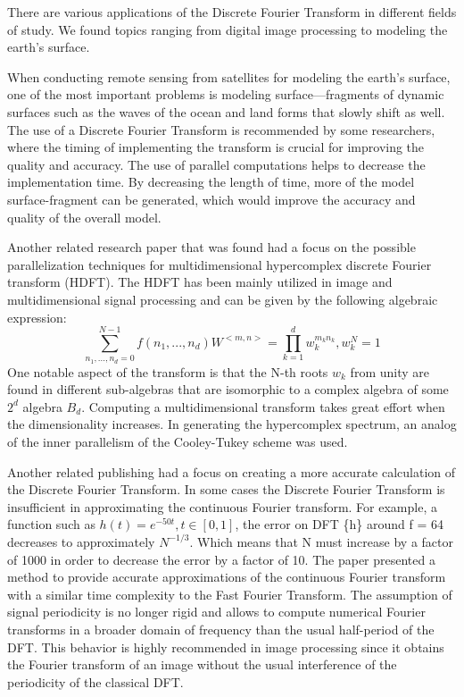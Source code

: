 \documentclass[journal]{IEEEtran}
\begin{document}
	\par{
		There are various applications of the Discrete Fourier Transform in different fields of study. We found topics ranging from digital 
		image processing to modeling the earth's surface.
	}
	\par{
		When conducting remote sensing from satellites for modeling the earth's surface, one of the most important problems is 
		modeling surface—fragments of dynamic surfaces such as the waves of the ocean and land forms that slowly shift as well. 
		The use of a Discrete Fourier Transform is recommended by some researchers, where the timing of implementing the transform 
		is crucial for improving the quality and accuracy. The use of parallel computations helps to decrease the implementation time. 
		By decreasing the length of time, more of the model surface-fragment can be generated, which would improve the accuracy and 
		quality of the overall model.
	}
	\cite{book:GIS}
	\par{
		Another related research paper that was found had a focus on the possible parallelization techniques for multidimensional 
		hypercomplex discrete Fourier transform (HDFT). The HDFT has been mainly utilized in image and multidimensional signal 
		processing and can be given by the following algebraic expression:
		\[ \sum_{n_1,...,n_d=0}^{N-1} f(n_1,...,n_d)W^{<m,n>} = \prod_{k=1}^{d} w_k^{m_kn_k}, w_k^{N} = 1\]
		One notable aspect of the transform is that the N-th roots $w_{k}$ from unity are found in different sub-algebras that are 
		isomorphic to a complex algebra of some $2^{d}$ algebra $B_{d}$. Computing a multidimensional transform takes great effort 
		when the dimensionality increases. In generating the hypercomplex spectrum, an analog of the inner parallelism of the 
		Cooley-Tukey scheme was used.
	}
	\cite{Chicheva}
	\par{
		Another related publishing had a focus on creating a more accurate calculation of the Discrete Fourier Transform. 
		In some cases the Discrete Fourier Transform is insufficient in approximating the continuous Fourier transform. 
		For example, a function such as $h (t) = e^{-50t}, t\in [0,1]$, the error on DFT \{h\} around f = 64 decreases 
		to approximately $N^{-1/3}$. Which means that N must increase by a factor of 1000 in order to decrease the error 
		by a factor of 10. The paper presented a method to provide accurate approximations of the continuous Fourier 
		transform with a similar time complexity to the Fast Fourier Transform. The assumption of signal periodicity 
		is no longer rigid and allows to compute numerical Fourier transforms in a broader domain of frequency than the 
		usual half-period of the DFT. This behavior is highly recommended in image processing since it obtains the Fourier 
		transform of an image without the usual interference of the periodicity of the classical DFT.
	}
	\cite{Beaudoin}
\end{document}
